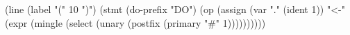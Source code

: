 \begin{CodeBlock}
(line
 (label "(" 10 ")")
 (stmt
  (do-prefix "DO")
  (op
   (assign
    (var "." (ident 1))
    "<-"
    (expr (mingle (select (unary (postfix (primary "#" 1))))))))))

\end{CodeBlock}
